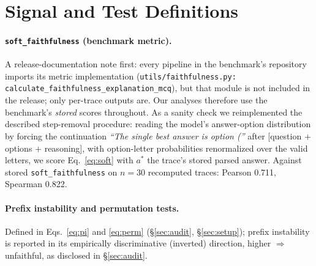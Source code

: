 \documentclass{article}
\begin{document}
\section{Signal and Test Definitions}
\label{app:defs}

\paragraph{\texttt{soft\_faithfulness} (benchmark metric).} A release-documentation note first: every pipeline in the benchmark's repository imports its metric implementation (\texttt{utils/faithfulness.py:} \texttt{calculate\_faithfulness\_explanation\_mcq}), but that module is not included in the release; only per-trace outputs are. Our analyses therefore use the benchmark's \emph{stored} scores throughout. As a sanity check we reimplemented the described step-removal procedure: reading the model's answer-option distribution by forcing the continuation \emph{``The single best answer is option (''} after [question $+$ options $+$ reasoning], with option-letter probabilities renormalized over the valid letters, we score Eq.~\ref{eq:soft} with $a^{\ast}$ the trace's stored parsed answer. Against stored \texttt{soft\_faithfulness} on $n{=}30$ recomputed traces: Pearson 0.711, Spearman 0.822.

\paragraph{Prefix instability and permutation tests.} Defined in Eqs.~\ref{eq:pi} and \ref{eq:perm} (\S\ref{sec:audit}, \S\ref{sec:setup}); prefix instability is reported in its empirically discriminative (inverted) direction, higher $\Rightarrow$ unfaithful, as disclosed in \S\ref{sec:audit}.
\end{document}
